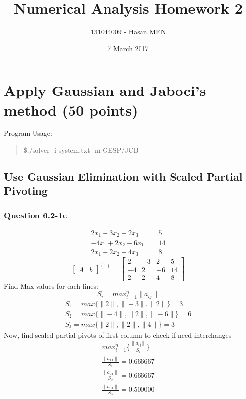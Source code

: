 \documentclass{article}
\title{Numerical Analysis Homework 2}
\author{131044009 - Hasan MEN}
\date{7 March 2017}
\begin{document}
\maketitle

\section{Apply Gaussian and Jaboci's method (50 points)}
Program Usage: 
\begin{quote}
	\$./solver -i system.txt -m {GESP/JCB}
\end{quote}


\subsection{Use Gaussian Elimination with Scaled Partial Pivoting}
\subsubsection{Question 6.2-1c}
\begin{align}
\label{q6.2.1.c.1}2x_{1}-3x_{2}+2x_{3}&=5 \\
\label{q6.2.1.c.2}-4x_{1}+2x_{2}-6x_{3}&=14 \\
\label{q6.2.1.c.3}2x_{1}+2x_{2}+4x_{3}&=8
\end{align}
\[
\left[
\begin{array}{c|c}
A&b
\end{array}
\right]^{(1)}
=
\left[
\begin{array}{ccc|c}
	2&-3&2&5\\
	-4&2&-6&14\\
	2&2&4&8 
\end{array}
\right]
\]
Find Max values for each lines: 
\begin{equation}
\label{findSMax}S_{i}=max_{i=1}^n\|a_{ij}\|
\end{equation}
\begin{align}
	S_{1}=max\{\|2\|,\|-3\|,\|2\|\}=3\\
	S_{2}=max\{\|-4\|,\|2\|,\|-6\|\}=6\\
	S_{3}=max\{\|2\|,\|2\|,\|4\|\}=3
\end{align}
Now, find scaled partial pivots of first column to check if need interchanges
\begin{align}
	max_{i=1}^n\{\frac{\|a_{ij}\|}{S_{i}}\}\\
	\frac{\|a_{11}\|}{S_{1}}=0.666667\\
	\frac{\|a_{21}\|}{S_{2}}=0.666667\\
	\frac{\|a_{31}\|}{S_{3}}=0.500000
\end{align}
\end{document}
